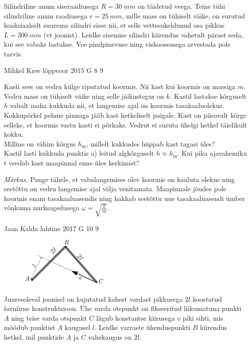\documentclass[11pt]{article}
\begin{document}
{{Silindriline anum siseraadiusega $R = \SI{30}{mm}$ on täidetud veega. Teine tühi silindriline anum raadiusega $r =\SI{25}{mm}$, mille mass on tühiselt väike, on surutud koaksiaalselt suurema silindri sisse nii, et selle vettesukeldunud osa pikkus $L = \SI{300}{mm}$ (vt joonist). Leidke sisemise silindri kiirendus vahetult pärast seda, kui see vabaks lastakse. Vee pindpinevuse ning viskoossusega arvestada pole tarvis.
\fi
}

{Mihkel Kree} %
{lõppvoor} %
{2015} %
{G 8} %
{9} %
{
\ifStatement
Kasti sees on vedru külge riputatud koormis. Nii kast kui koormis on massiga $m$. Vedru mass on tühiselt väike ning selle jäikustegur on $k$. Kastil lastakse kõrguselt $h$ vabalt maha kukkuda nii, et langemise ajal on koormis tasakaaluolekus. Kokkupõrkel pehme pinnaga jääb kast hetkeliselt paigale. Kast on piisavalt kõrge selleks, et koormis vastu kasti ei põrkaks. Vedrut ei suruta ühelgi hetkel täielikult kokku.\\
\osa Milline on vähim kõrgus $h_\text{m}$, millelt kukkudes hüppab kast tagasi üles?\\
\osa Kastil lasti kukkuda punktis a) leitud algkõrguselt $h\approx h_\text{m}$. Kui pika ajavahemiku $t$ veedab kast maapinnal enne üles kerkimist? 

\emph{Märkus.} Pange tähele, et vabalangemises olev koormis on kaaluta olekus ning seetõttu on vedru langemise ajal välja venitamata. Maapinnale jõudes pole koormis enam tasakaaluasendis ning hakkab seetõttu uue tasakaaluasendi ümber võnkuma nurksagedusega $\omega =\sqrt{\frac{k}{m}}$.
\fi
}

{Jaan Kalda} %
{lahtine} %
{2017} %
{G 10} %
{9} %
{
\ifStatement
\begin{figure}
	\vspace{-10pt}
	\includegraphics[width = 0.4\textwidth] {2017-lahg-10-delta.pdf}
\end{figure}

Juuresoleval joonisel on kujutatud kahest vardast pikkusega $2l$ koostatud \v sarniirne konstruktsioon. Ühe varda otspunkt on fikseeritud liikumatuna punkti $A$ ning teise varda otspunkt $C$ liigub konstantse kiirusega $v$ piki sihti, mis möödub punktist $A$ kaugusel $l$. Leidke varraste ühenduspunkti $B$ kiirendus hetkel, mil punktide $A$ ja $C$ vahekaugus on $2l$.
\fi
}
\newpage\subsection{\protect{}}

}
\end{document}
